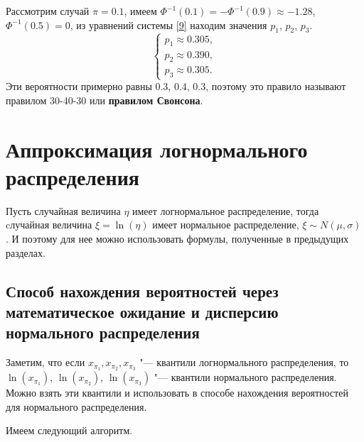 \documentclass[12pt]{article}
\begin{document}
	Рассмотрим случай $\pi = 0.1$, имеем $\Phi ^{-1}(0.1) = -\Phi ^{-1}(0.9) \approx  -1.28$, $\Phi ^{-1}(0.5) = 0$, из уравнений системы \eqref{9} находим значения $p_{1}$, $p_{2}$, $p_{3}$.
	\begin{equation*}
		\begin{cases}
			p_{1}\approx 0.305, \\ 
			p_{2}\approx 0.390,  \\ 
			p_{3}\approx 0.305.
		\end{cases}
	\end{equation*}
	Эти вероятности примерно равны 0.3, 0.4, 0.3, поэтому это правило называют правилом 30-40-30 или \textbf{правилом Свонсона}.
	
	\section{Аппроксимация логнормального распределения}
	Пусть случайная величина $\eta$ имеет логнормальное распределение, тогда cлучайная величина $\xi = \ln(\eta)$ имеет нормальное распределение, $\xi \sim N(\mu, \sigma)$. И поэтому для нее можно использовать формулы, полученные в предыдущих разделах.
	
	\subsection{Способ нахождения вероятностей через математическое ожидание и дисперсию нормального распределения}
	Заметим, что если
	$x_{\pi_{1}}, x_{\pi_{2}}, x_{\pi_{3}}$ "--- квантили логнормального распределения, то $\ln(x_{\pi_{1}})$, $\ln(x_{\pi_{2}})$, $\ln(x_{\pi_{3}})$ "--- квантили нормального распределения. Можно взять эти квантили и использовать в способе нахождения вероятностей для нормального распределения. 
	
	Имеем следующий алгоритм.
\end{document}
